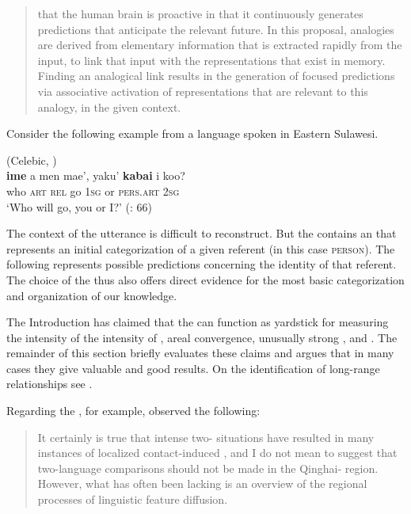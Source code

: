 \begin{quote}
that the human brain is proactive in that it continuously generates predictions that anticipate the relevant future. In this proposal, analogies are derived from elementary information that is extracted rapidly from the input, to link that input with the representations that exist in memory. Finding an analogical link results in the generation of focused predictions via associative activation of representations that are relevant to this analogy, in the given context.
\end{quote}

\noindent Consider the following example from a language spoken in Eastern Sulawesi.

\ea%
     (Celebic, )\\
    \label{ex:key:2}
    \gll \textbf{{i}}\textbf{{me}} {a} {men} {mae',} {yaku'} \textbf{{kabai}} {i} {koo?}\\
        who  \textsc{art}  \textsc{rel}  go  1\textsc{sg}  or  \textsc{pers.art}  2\textsc{sg}\\
    \glt ‘Who will go, you or I?’ (\citealt{vandenBergBusenitz2012}: 66)
    \z

\noindent The context of the utterance is difficult to reconstruct. But the  contains an  that represents an initial categorization of a given referent (in this case \textsc{person}). The following  represents possible predictions concerning the identity of that referent. The choice of the  thus also offers direct evidence for the most basic categorization and organization of our knowledge.

The Introduction has claimed that the  can function as yardstick for measuring the intensity of the intensity of , areal convergence, unusually strong , and . The remainder of this section briefly evaluates these claims and argues that in many cases they give valuable and good results. On the identification of long-range relationships see .

Regarding the , for example, \citet[6]{Slater2003a} observed the following:

\begin{quote}
It certainly is true that intense two- situations have resulted in many instances of localized contact-induced , and I do not mean to suggest that two-language comparisons should not be made in the Qinghai- region. However, what has often been lacking is an overview of the regional processes of linguistic feature diffusion.
\end{quote}

